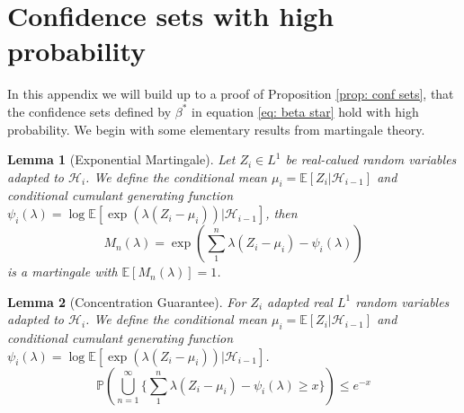 \documentclass{article}
\newtheorem{lemma}{Lemma}
\newcommand{\Exp}{\mathds{E}}
\newcommand{\Prob}{\mathds{P}}
\begin{document}
\section{Confidence sets with high probability}
\label{app: conf sets}
In this appendix we will build up to a proof of Proposition \ref{prop: conf sets}, that the confidence sets defined by $\beta^*$ in equation \ref{eq: beta star} hold with high probability.
We begin with some elementary results from martingale theory.

\begin{lemma}[Exponential Martingale]
\hspace{0.000000001mm} \newline
Let $Z_i \in L^1$ be real-calued random variables adapted to $\mathcal{H}_i$.
We define the conditional mean $\mu_i = \Exp[ Z_i | \mathcal{H}_{i-1} ] $ and conditional cumulant generating function $\psi_i(\lambda) = \log \Exp [ \exp \left(\lambda ( Z_i -\mu_i)\right) | \mathcal{H}_{i-1} ] $, then
$$ M_n ( \lambda ) = \exp \left( \sum_1^n \lambda (Z_i -\mu_i) - \psi_i(\lambda) \right) $$
is a martingale with $\Exp[M_n(\lambda)] = 1$.
\end{lemma}

\begin{lemma}[Concentration Guarantee]
\label{lem: mg conc} \hspace{0.000000001mm} \newline
For $Z_i$ adapted real $L^1$ random variables adapted to $\mathcal{H}_i$. We define the conditional mean $\mu_i = \Exp[ Z_i | \mathcal{H}_{i-1} ] $ and conditional cumulant generating function $\psi_i(\lambda) = \log \Exp [ \exp \left(\lambda ( Z_i -\mu_i)\right) | \mathcal{H}_{i-1} ] $.
$$ \Prob \left( \bigcup_{n=1}^\infty \{ \sum_1^n \lambda (Z_i -\mu_i) - \psi_i(\lambda) \ge x\} \right) \le e^{-x}$$
\end{lemma}
\end{document}
